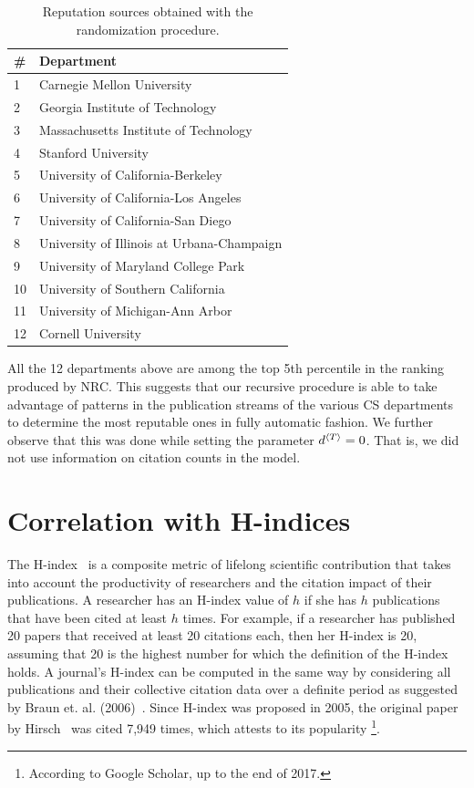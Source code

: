 \documentclass[man]{apa6}
\begin{document}
\begin{table}[h!]
 \centering
 \begin{tabular}{l l} 
 \toprule
 \# & Department \\ 
 \midrule
 1  & Carnegie Mellon University \\
 2  & Georgia Institute of Technology \\
 3  & Massachusetts Institute of Technology \\
 4  & Stanford University \\
 5  & University of California-Berkeley \\
 6  & University of California-Los Angeles \\
 7  & University of California-San Diego \\
 8  & University of Illinois at Urbana-Champaign \\
 9  & University of Maryland College Park \\
 10 & University of Southern California \\
 11 & University of Michigan-Ann Arbor \\
 12 & Cornell University \\
 \bottomrule
 \end{tabular}
 \caption{Reputation sources obtained with the randomization procedure.}
 \label{tab:departments}
\end{table}

All the 12 departments above are among the top 5th percentile in the ranking produced by NRC. 
This suggests that our recursive procedure is able to take advantage of patterns in the publication 
streams of the various CS departments to determine the most reputable ones in fully automatic fashion.
We further observe that this was done while setting the parameter $d{^{\langle T \rangle}} = 0$. That is, we did 
not use information on citation counts in the model. 

\section{Correlation with H-indices} 
\label{sec:correlation}

The H-index~\cite{Hirsch2005} is a composite metric of lifelong scientific contribution that takes 
into account the productivity of researchers and the citation impact of their publications.
A researcher has an H-index value of $ h $ if she has $ h $ publications that have been cited at 
least $ h $ times. For example, if a researcher has published 20 papers that received at least 20 
citations each, then her H-index is 20, assuming that 20 is the highest number for which the 
definition of the H-index holds. A journal's H-index can be computed 
in the same way by considering all publications and their collective citation data over a 
definite period as suggested by Braun et. al. (2006)~\cite{Braun2006}.
Since H-index was proposed in 2005, the original paper by Hirsch~\cite{Hirsch2005} was 
cited 7,949 times, which attests to its popularity 
\footnote{According to Google Scholar, up to the end of 2017.}.
\end{document}
